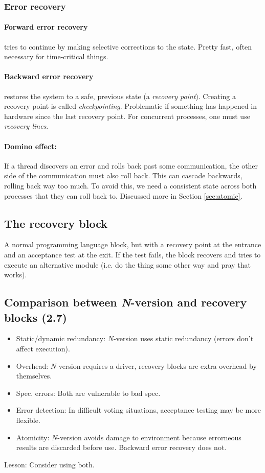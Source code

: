 \documentclass[a4paper, 12pt]{article}
\begin{document}
\subsubsection{Error recovery}
\paragraph{Forward error recovery} tries to continue by making selective corrections to the state. Pretty fast, often necessary for time-critical things.
\paragraph{Backward error recovery} restores the system to a safe, previous state (a \emph{recovery point}). Creating a recovery point is called \emph{checkpointing}. Problematic if something has happened in hardware since the last recovery point. For concurrent processes, one must use \emph{recovery lines}.
\paragraph{Domino effect:} If a thread discovers an error and rolls back past some communication, the other side of the communication must also roll back. This can cascade backwards, rolling back way too much. To avoid this, we need a consistent state across both processes that they can roll back to. Discussed more in Section \ref{sec:atomic}.

\subsection{The recovery block}
A normal programming language block, but with a recovery point at the entrance and an acceptance test at the exit. If the test fails, the block recovers and tries to execute an alternative module (i.e. do the thing some other way and pray that works).
% 

\subsection{Comparison between \textit{N}-version and recovery blocks (2.7)}
\begin{itemize}
	\item Static/dynamic redundancy: \(N\)-version uses static redundancy (errors don't affect execution).
	\item Overhead: \(N\)-version requires a driver, recovery blocks are extra overhead by themselves.
	\item Spec. errors: Both are vulnerable to bad spec.
	\item Error detection: In difficult voting situations, acceptance testing may be more flexible.
	\item Atomicity: \(N\)-version avoids damage to environment because errorneous results are discarded before use. Backward error recovery does not.
\end{itemize}
Lesson: Consider using both.
\end{document}
